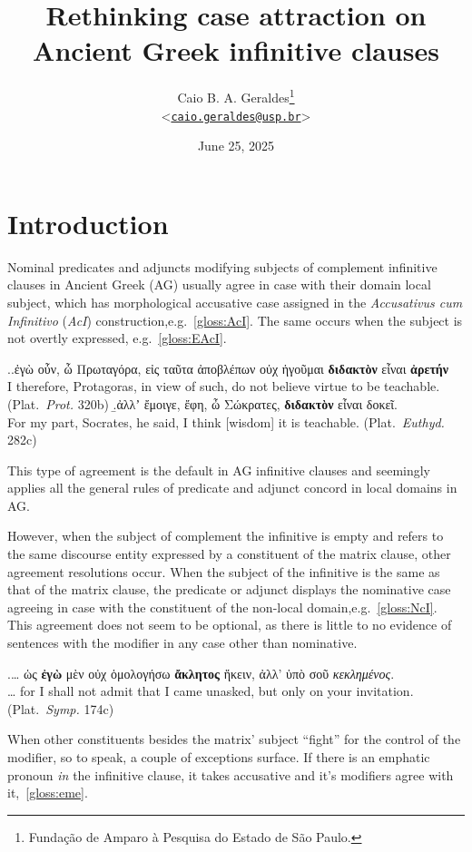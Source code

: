 \documentclass[a4paper, 12pt, article]{memoir}
\title{Rethinking case attraction on Ancient Greek infinitive clauses}
\author{
  Caio B. A. Geraldes\thanks{Fundação de Amparo à Pesquisa do Estado de São
  Paulo.}
	\\\smallskip
	<\href{mailto:caio.geraldes@usp.br}{\texttt{caio.geraldes@usp.br}}>
}
\date{June 25, 2025}
\begin{document}
\maketitle


\chapter{Introduction} %

Nominal predicates and adjuncts modifying subjects of complement infinitive
clauses in Ancient Greek (AG) usually agree in case with their domain local
subject, which has morphological accusative case assigned in the
\emph{Accusativus cum Infinitivo} (\emph{AcI}) construction,e.g.~\ref{gloss:AcI}.
The same occurs when the subject is not overtly expressed,
e.g.~\ref{gloss:EAcI}.


\ex.\a.\label{gloss:AcI}ἐγὼ οὖν, ὦ Πρωταγόρα, εἰς ταῦτα ἀποβλέπων οὐχ ἡγοῦμαι
\textbf{διδακτὸν} εἶναι \textbf{ἀρετήν}\\
I therefore, Protagoras, in view of such, do not believe virtue to be
teachable. (Plat.\ \emph{Prot.} 320b)
\b.\label{gloss:EAcI}ἀλλʼ ἔμοιγε, ἔφη, ὦ Σώκρατες, \textbf{διδακτὸν} εἶναι δοκεῖ.\\
For my part, Socrates, he said, I think [wisdom] it is teachable. (Plat.\
\emph{Euthyd.} 282c)

This type of agreement is the default in AG infinitive clauses and seemingly
applies all the general rules of predicate and adjunct concord in local domains
in AG\@.

However, when the subject of complement the infinitive is empty and refers to
the same discourse entity expressed by a constituent of the matrix clause, other
agreement resolutions occur.
When the subject of the infinitive is the same as that of the matrix clause, the
predicate or adjunct displays the nominative case agreeing in
case with the constituent of the non-local
domain,e.g.~\ref{gloss:NcI}.
This agreement does not seem to be optional, as there is little to no evidence
of sentences with the modifier in any case other than nominative.

\ex.\label{gloss:NcI}\ldots{} ὡς \textbf{ἐγὼ} μὲν οὐχ ὁμολογήσω \textbf{ἄκλητος}
ἥκειν, ἀλλ' ὑπὸ σοῦ \emph{κεκλημένος}.\\
\ldots{} for I shall not admit that I came unasked, but only on your invitation.
(Plat.\ \emph{Symp.} 174c)


When other constituents besides the matrix' subject ``fight'' for the control of
the modifier, so to speak, a couple of exceptions surface. If there is an
emphatic pronoun \emph{in} the infinitive clause, it takes accusative and it's
modifiers agree with it,~\ref{gloss:eme}.
\end{document}
